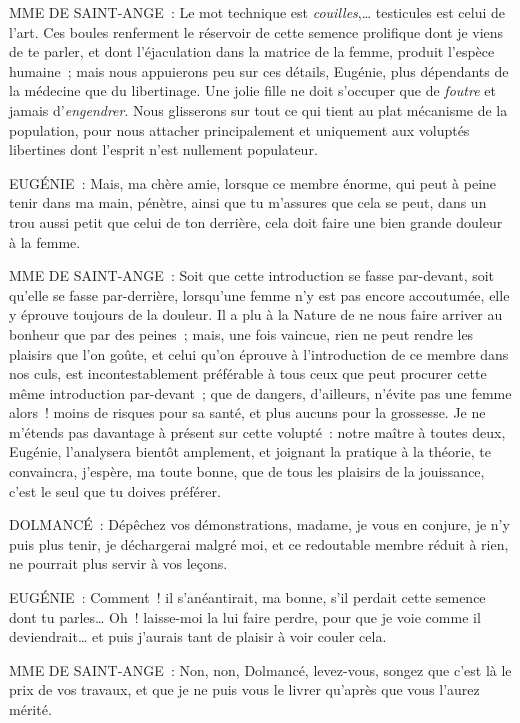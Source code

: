 \documentclass[french,twoside]{book} %
\begin{document}
MME DE SAINT-ANGE : Le mot technique est {\itshape couilles},… testicules est celui de l’art. Ces boules renferment le réservoir de cette semence prolifique dont je viens de te parler, et dont l’éjaculation dans la matrice de la femme, produit l’espèce humaine ; mais nous appuierons peu sur ces détails, Eugénie, plus dépendants de la médecine que du libertinage. Une jolie fille ne doit s’occuper que de {\itshape foutre} et jamais d’{\itshape engendrer}. Nous glisserons sur tout ce qui tient au plat mécanisme de la population, pour nous attacher principalement et uniquement aux voluptés libertines dont l’esprit n’est nullement populateur.\par
EUGÉNIE : Mais, ma chère amie, lorsque ce membre énorme, qui peut à peine tenir dans ma main, pénètre, ainsi que tu m’assures que cela se peut, dans un trou aussi petit que celui de ton derrière, cela doit faire une bien grande douleur à la femme.\par
MME DE SAINT-ANGE : Soit que cette introduction se fasse par-devant, soit qu’elle se fasse par-derrière, lorsqu’une femme n’y est pas encore accoutumée, elle y éprouve toujours de la douleur. Il a plu à la Nature de ne nous faire arriver au bonheur que par des peines ; mais, une fois vaincue, rien ne peut rendre les plaisirs que l’on goûte, et celui qu’on éprouve à l’introduction de ce membre dans nos culs, est incontestablement préférable à tous ceux que peut procurer cette même introduction par-devant ; que de dangers, d’ailleurs, n’évite pas une femme alors ! moins de risques pour sa santé, et plus aucuns pour la grossesse. Je ne m’étends pas davantage à présent sur cette volupté : notre maître à toutes deux, Eugénie, l’analysera bientôt amplement, et joignant la pratique à la théorie, te convaincra, j’espère, ma toute bonne, que de tous les plaisirs de la jouissance, c’est le seul que tu doives préférer.\par
DOLMANCÉ : Dépêchez vos démonstrations, madame, je vous en conjure, je n’y puis plus tenir, je déchargerai malgré moi, et ce redoutable membre réduit à rien, ne pourrait plus servir à vos leçons.\par
EUGÉNIE : Comment ! il s’anéantirait, ma bonne, s’il perdait cette semence dont tu parles… Oh ! laisse-moi la lui faire perdre, pour que je voie comme il deviendrait… et puis j’aurais tant de plaisir à voir couler cela.\par
MME DE SAINT-ANGE : Non, non, Dolmancé, levez-vous, songez que c’est là le prix de vos travaux, et que je ne puis vous le livrer qu’après que vous l’aurez mérité.\par
\end{document}
